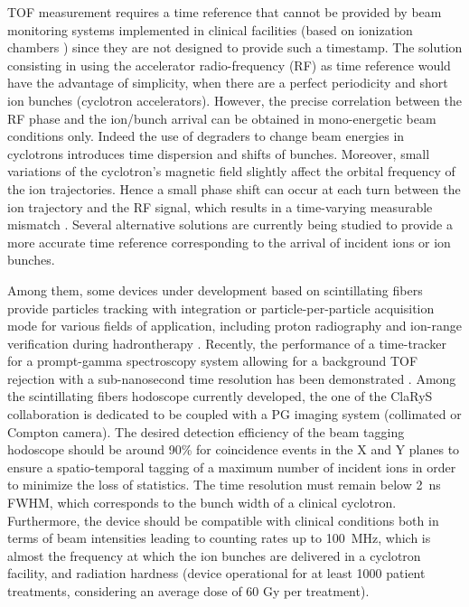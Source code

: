 \documentclass[a4paper,11pt]{article}
\begin{document}
TOF measurement requires a time reference that cannot be provided by beam monitoring systems implemented in clinical facilities (based on ionization chambers \cite{Stelzer2002}) since they are not designed to provide such a timestamp. The solution consisting in using the accelerator radio-frequency (RF) as time reference would have the advantage of simplicity, when there are a perfect periodicity and short ion bunches (cyclotron accelerators). However, the precise correlation between the RF phase and the ion/bunch arrival can be obtained in mono-energetic beam conditions only. Indeed the use of degraders to change beam energies in cyclotrons introduces time dispersion and shifts of bunches. Moreover, small variations of the cyclotron’s magnetic field slightly affect the orbital frequency of the ion trajectories. Hence a small phase shift can occur at each turn between the ion trajectory and the RF signal, which results in a time-varying measurable mismatch \cite{Petzoldt2016}. Several alternative solutions are currently being studied to provide a more accurate time reference corresponding to the arrival of incident ions or ion bunches.

Among them, some devices under development based on scintillating fibers provide particles tracking with integration \cite{Leverington2018} or particle-per-particle \cite{Horikawa2004, Achenbach2008, Braccini2012} acquisition mode for various fields of application, including proton radiography \cite{Presti2016} and ion-range verification during hadrontherapy \cite{PAPA2016}. Recently, the performance of a time-tracker for a prompt-gamma spectroscopy system allowing for a background TOF rejection with a sub-nanosecond time resolution has been demonstrated \cite{Martins2020}. Among the scintillating fibers hodoscope currently developed, the one of the ClaRyS collaboration is dedicated to be coupled with a PG imaging system (collimated or Compton camera). The desired detection efficiency of the beam tagging hodoscope should be around 90\% for coincidence events in the X and Y planes to ensure a spatio-temporal tagging of a maximum number of incident ions in order to minimize the loss of statistics. The time resolution must remain below 2~ns FWHM, which corresponds to the bunch width of a clinical cyclotron. Furthermore, the device should be compatible with clinical conditions both in terms of beam intensities leading to counting rates up to 100~MHz, which is almost the frequency at which the ion bunches are delivered in a cyclotron facility, and radiation hardness (device operational for at least 1000 patient treatments, considering an average dose of 60 Gy per treatment).
\end{document}
